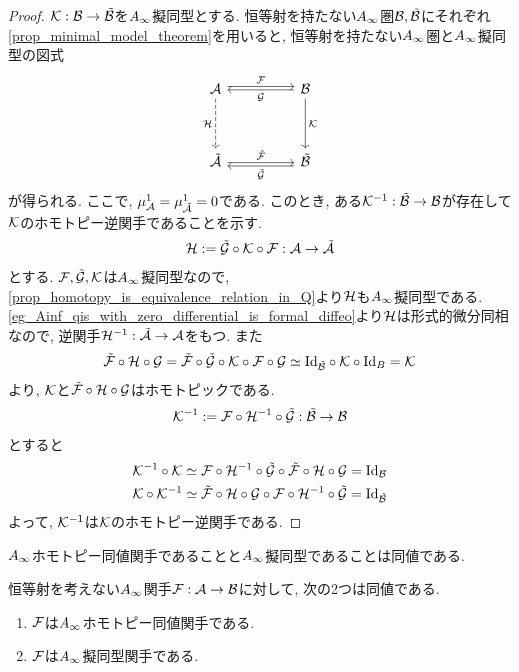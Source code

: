 \documentclass[uplatex, a4paper, 14Q, dvipdfmx]{jsarticle}
\begin{document}
\begin{proof} 
  $\mathcal{K} : \mathcal{B} \to \tilde{\mathcal{B}}$を$A_{\infty}$擬同型とする. 
  恒等射を持たない$A_{\infty}$圏$\mathcal{B},\tilde{\mathcal{B}}$にそれぞれ\cref{prop_minimal_model_theorem}を用いると, 恒等射を持たない$A_{\infty}$圏と$A_{\infty}$擬同型の図式
  \[\begin{tikzcd}
    \A && \B \\
    \\
    {\tilA} && {\tilB}
    \arrow["\F", shift left=1, from=1-1, to=1-3]
    \arrow["\K", from=1-3, to=3-3]
    \arrow["\H"', dashed, from=1-1, to=3-1]
    \arrow["{\tilde{\F}}", from=3-1, to=3-3]
    \arrow["\G", from=1-3, to=1-1]
    \arrow["{\tilde{\G}}", shift left=1, from=3-3, to=3-1]
  \end{tikzcd}\]
  が得られる. 
  ここで, $\mu^1_{\mathcal{A}} = \mu^1_{\tilde{\mathcal{A}}} = 0$である. 
  このとき, ある$\mathcal{K}^{-1} : \tilde{\mathcal{B}} \to \mathcal{B}$が存在して$\mathcal{K}$のホモトピー逆関手であることを示す. 
  \begin{align*}
    \mathcal{H} := \tilde{\mathcal{G}} \circ \mathcal{K} \circ \mathcal{F} : \mathcal{A} \to \tilde{\mathcal{A}}
  \end{align*}
  とする. 
  $\mathcal{F}, \tilde{\mathcal{G}}, \mathcal{K}$は$A_{\infty}$擬同型なので, \cref{prop_homotopy_is_equivalence_relation_in_Q}より$\mathcal{H}$も$A_{\infty}$擬同型である. 
  \cref{eg_Ainf_qis_with_zero_differential_is_formal_diffeo}より$\mathcal{H}$は形式的微分同相なので, 逆関手$\mathcal{H}^{-1} : \tilde{\mathcal{A}} \to \mathcal{A}$をもつ. 
  また
  \begin{align*}
    \tilde{\mathcal{F}} \circ \mathcal{H} \circ \mathcal{G} 
    = \tilde{\mathcal{F}} \circ \tilde{\mathcal{G}} \circ \mathcal{K} \circ \mathcal{F} \circ \mathcal{G} 
    \simeq \mathrm{Id}_{\tilde{\mathcal{B}}} \circ \mathcal{K} \circ \mathrm{Id}_B 
    = \mathcal{K}
  \end{align*}
  より, $\mathcal{K}$と$\tilde{\mathcal{F}} \circ \mathcal{H} \circ \mathcal{G}$はホモトピックである. 
  \begin{align*}
    \mathcal{K}^{-1} := \mathcal{F} \circ \mathcal{H}^{-1} \circ \tilde{\mathcal{G}} : \tilde{\mathcal{B}} \to \mathcal{B}
  \end{align*}
  とすると 
  \begin{align*}
    &\mathcal{K}^{-1} \circ \mathcal{K} 
    \simeq \mathcal{F} \circ \mathcal{H}^{-1} \circ \tilde{\mathcal{G}} \circ \tilde{\mathcal{F}} \circ \mathcal{H} \circ \mathcal{G} 
    =\mathrm{Id}_{\mathcal{B}} \\
    &\mathcal{K} \circ \mathcal{K}^{-1}
    \simeq \tilde{\mathcal{F}} \circ \mathcal{H} \circ \mathcal{G} \circ \mathcal{F} \circ \mathcal{H}^{-1} \circ \tilde{\mathcal{G}} 
    = \mathrm{Id}_{\tilde{\mathcal{B}}}
  \end{align*}
  よって, $\mathcal{K}^{-1}$は$\mathcal{K}$のホモトピー逆関手である. 
\end{proof}

$A_{\infty}$ホモトピー同値関手であることと$A_{\infty}$擬同型であることは同値である. 

\begin{corollary}
  恒等射を考えない$A_{\infty}$関手$\mathcal{F} : \mathcal{A} \to \mathcal{B}$に対して, 次の2つは同値である.
  \begin{enumerate}
    \item $\mathcal{F}$は$A_{\infty}$ホモトピー同値関手である. 
    \item $\mathcal{F}$は$A_{\infty}$擬同型関手である. 
  \end{enumerate} 
\end{corollary}
\end{document}
